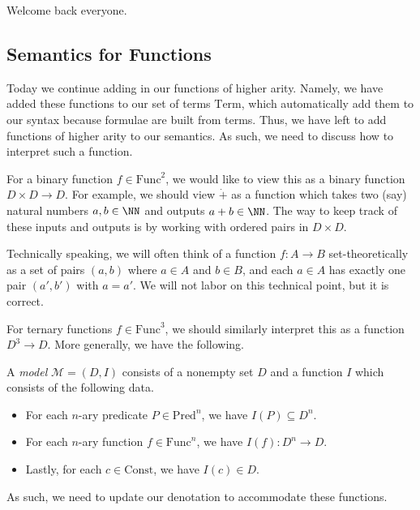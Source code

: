 \documentclass[../notes.tex]{subfiles}
\begin{document}

Welcome back everyone.

\subsection{Semantics for Functions}
Today we continue adding in our functions of higher arity. Namely, we have added these functions to our set of terms $\mathrm{Term}$, which automatically add them to our syntax because formulae are built from terms. Thus, we have left to add functions of higher arity to our semantics. As such, we need to discuss how to interpret such a function.
\begin{example}
	For a binary function $f\in\mathrm{Func}^2$, we would like to view this as a binary function $D\times D\to D$. For example, we should view $\dot+$ as a function which takes two (say) natural numbers $a,b\in\NN$ and outputs $a+b\in\NN$. The way to keep track of these inputs and outputs is by working with ordered pairs in $D\times D$.
\end{example}
\begin{remark}
	Technically speaking, we will often think of a function $f:A\to B$ set-theoretically as a set of pairs $(a,b)$ where $a\in A$ and $b\in B$, and each $a\in A$ has exactly one pair $(a',b')$ with $a=a'$. We will not labor on this technical point, but it is correct.
\end{remark}
For ternary functions $f\in\mathrm{Func}^3$, we should similarly interpret this as a function $D^3\to D$. More generally, we have the following.
\begin{defihelper}[Model]
	A \textit{model} $\mathcal M=(D,I)$ consists of a nonempty set $D$ and a function $I$ which consists of the following data.
	\begin{itemize}
		\item For each $n$-ary predicate $P\in\mathrm{Pred}^n$, we have $I(P)\subseteq D^n$.
		\item For each $n$-ary function $f\in\mathrm{Func}^n$, we have $I(f):D^n\to D$.
		\item Lastly, for each $c\in\mathrm{Const}$, we have $I(c)\in D$.
	\end{itemize}
\end{defihelper}
As such, we need to update our denotation to accommodate these functions.
\end{document}
